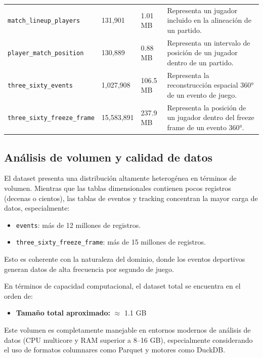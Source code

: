\documentclass[12pt,a4paper]{article}
\begin{document}
\begin{center}
\begin{longtable}{T{4.5cm} p{2.2cm} p{2.0cm} p{6.2cm}}
\texttt{match\_lineup\_players} & 131,901 & 1.01 MB & Representa un jugador incluido en la alineación de un partido. \\

\texttt{player\_match\_position} & 130,889 & 0.88 MB & Representa un intervalo de posición de un jugador dentro de un partido. \\

\texttt{three\_sixty\_events} & 1,027,908 & 106.5 MB & Representa la reconstrucción espacial 360° de un evento de juego. \\

\texttt{three\_sixty\_freeze\_frame} & 15,583,891 & 237.9 MB & Representa la posición de un jugador dentro del freeze frame de un evento 360°. \\

\bottomrule
\end{longtable}
\end{center}

\subsection{Análisis de volumen y calidad de datos}

El dataset presenta una distribución altamente heterogénea en términos de volumen. Mientras que las tablas dimensionales contienen pocos registros (decenas o cientos), las tablas de eventos y tracking concentran la mayor carga de datos, especialmente:

\begin{itemize}
    \item \texttt{events}: más de 12 millones de registros.
    \item \texttt{three\_sixty\_freeze\_frame}: más de 15 millones de registros.
\end{itemize}

Esto es coherente con la naturaleza del dominio, donde los eventos deportivos generan datos de alta frecuencia por segundo de juego.

En términos de capacidad computacional, el dataset total se encuentra en el orden de:

\begin{itemize}
    \item \textbf{Tamaño total aproximado:} $\approx$ 1.1 GB
\end{itemize}

Este volumen es completamente manejable en entornos modernos de análisis de datos (CPU multicore y RAM superior a 8–16 GB), especialmente considerando el uso de formatos columnares como Parquet y motores como DuckDB.
\end{document}
